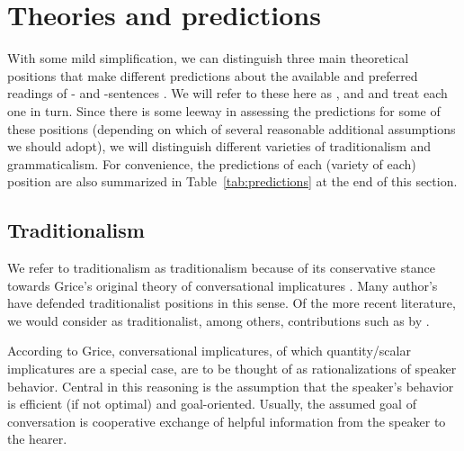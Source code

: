 \documentclass[fleqn,reqno,10pt,draft]{article}
\newcommand{\as}{\acro{as}}
\renewcommand{\es}{\acro{es}}
\newcommand{\mymark}[1]{{\color{mycol}{#1}}}
\begin{document}
\section{Theories and predictions}
\label{sec:theories-predictions}

With some mild simplification, we can distinguish three main
theoretical positions that make different predictions about the
available and preferred readings of \as- and \es-sentences
\citep[c.f.][]{Geurts2010:Quantity-Implic,Sauerland2012:The-Computation}. We
will refer to these here as \mymark{traditionalism},
\mymark{conventionalism} and \mymark{grammaticalism} and treat each
one in turn. Since there is some leeway in assessing the predictions
for some of these positions (depending on which of several reasonable
additional assumptions we should adopt), we will distinguish different
varieties of traditionalism and grammaticalism. For convenience, the
predictions of each (variety of each) position are also summarized in
Table~\ref{tab:predictions} at the end of this section.

\subsection{Traditionalism}
\label{sec:traditionalism}

We refer to traditionalism as traditionalism because of its
conservative stance towards Grice's original theory of conversational
implicatures \citep{Grice1975:Logic-and-Conve}. Many author's have
defended traditionalist positions in this sense. Of the more recent
literature, we would consider as traditionalist, among others,
contributions such as by
\citet{Spector2006:Scalar-Implicat,Sauerland2004:Scalar-Implicat,Russell2006:Against-Grammat,vanRooijSchulz:ExhaustiveInterpretation,Geurts2010:Quantity-Implic,Franke2011:Quantity-Implic}. 

 According to Grice,
conversational implicatures, of which quantity/scalar implicatures are
a special case, are to be thought of as rationalizations of speaker
behavior. Central in this reasoning is the assumption that the
speaker's behavior is efficient (if not optimal) and
goal-oriented. Usually, the assumed goal of conversation is
cooperative exchange of helpful information from the speaker to the
hearer.
\end{document}
